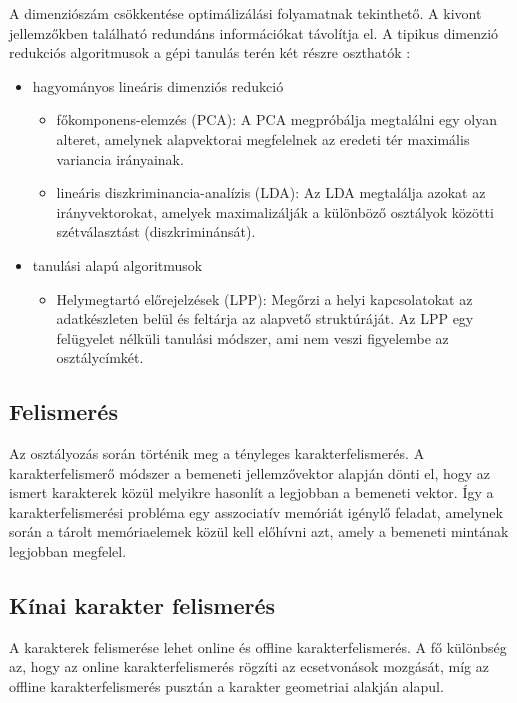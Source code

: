 A dimenziószám csökkentése optimálizálási folyamatnak tekinthető. A kivont jellemzőkben található redundáns információkat távolítja el. A tipikus dimenzió redukciós algoritmusok a gépi tanulás terén két részre oszthatók \cite{zhang2009patch}:
\begin{itemize}
\item hagyományos lineáris dimenziós redukció
	\begin{itemize}
	\item főkomponens-elemzés (PCA)\cite{gao2012dimensionality}: A PCA megpróbálja megtalálni egy olyan alteret, amelynek alapvektorai megfelelnek az eredeti tér maximális variancia irányainak.
	\item lineáris diszkriminancia-analízis (LDA)\cite{gao2012dimensionality}: Az LDA megtalálja azokat az irányvektorokat, amelyek maximalizálják a különböző osztályok közötti szétválasztást (diszkriminánsát).
	\end{itemize}
\item tanulási alapú algoritmusok
	\begin{itemize}
	\item Helymegtartó előrejelzések (LPP)\cite{gao2012dimensionality}: Megőrzi a helyi kapcsolatokat az adatkészleten belül és feltárja az alapvető struktúráját. Az LPP egy felügyelet nélküli tanulási módszer, ami nem veszi figyelembe az osztálycímkét.
	\end{itemize}
\end{itemize}


\subsection{Felismerés}

Az osztályozás során történik meg a tényleges karakterfelismerés. A karakterfelismerő módszer a bemeneti jellemzővektor alapján dönti el, hogy az ismert karakterek közül melyikre hasonlít a legjobban a bemeneti vektor. Így a karakterfelismerési probléma egy asszociatív memóriát igénylő feladat, amelynek során a tárolt memóriaelemek közül kell előhívni azt, amely a bemeneti mintának legjobban megfelel.\\

\subsection{Kínai karakter felismerés}

A karakterek felismerése lehet online és offline karakterfelismerés. A fő különbség az, hogy az online karakterfelismerés rögzíti az ecsetvonások mozgását, míg az offline karakterfelismerés pusztán a karakter geometriai alakján alapul.

